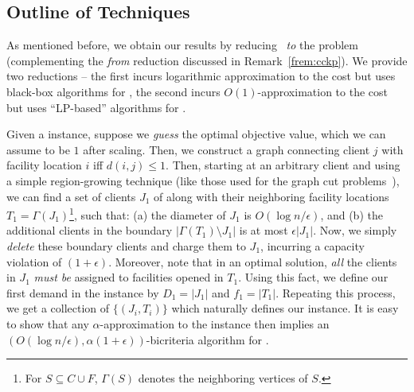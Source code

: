 \subsection{Outline of Techniques} \label{fsec:overview}
As mentioned before, we obtain our results by reducing \mckc~{\em to} the \cckp problem (complementing the {\em from} reduction  discussed in Remark~\ref{frem:cckp}).
We provide two reductions -- the first incurs logarithmic approximation to the cost but uses black-box algorithms for \cckp, the second incurs $O(1)$-approximation to the cost but uses ``LP-based'' algorithms for \cckp.

\medskip {}
Given a \mckc instance, suppose we \emph{guess} the optimal objective value, which we can assume to be $1$ after scaling. Then, we construct a graph connecting client $j$ with facility location $i$ iff $d(i,j) \leq 1$.
Then, starting at an arbitrary client and using a simple region-growing technique (like those used for the graph cut problems~\cite{LeightonR99,GargVY96}), we can find a set of clients $J_1$ of along with their neighboring facility locations $T_1 = \Gamma(J_1)$\footnote{For $S \subseteq C \cup F$, $\Gamma(S)$ denotes the neighboring vertices  of $S$.}, such that: (a) the diameter of $J_1$ is $O(\log n/\epsilon)$, and (b) the additional clients in the boundary $|\Gamma(T_1) \setminus J_1|$ is at most $\epsilon |J_1|$. Now, we simply \emph{delete} these boundary clients and charge them to $J_1$, incurring a capacity violation of $(1+\epsilon)$. Moreover, note that in an optimal solution, \emph{all} the clients in $J_1$ \emph{must be} assigned to facilities opened in $T_1$. Using this fact, we define our first demand in the \cckp instance by $D_1 = |J_1|$ and $f_1 = |T_1|$. Repeating this process, we get a collection of $\{(J_i,T_i)\}$ which naturally defines our \cckp instance. It is easy to show that any $\alpha$-approximation to the \cckp instance then implies an $(O(\log n/\epsilon),  \alpha(1+\epsilon))$-bicriteria algorithm for \mckc.

\iffalse
The weaker decomposition theorem (Theorem~\ref{fthm:weakdecomp}) states that we can delete a subset $\Cd$ of clients and partition the residual instance into portions we call {\em complete neighborhood sets} (Definition~\ref{fdef:comp-nbr}) of $O(\log n/\epsilon)$ diameter.
These sets consists of subsets of facilities $T_i$ and clients $J_i$ such that the optimal solution \emph{must} assign clients in $J_i$ to facilities in $T_i$. This collection of complete-neighborhood sets then naturally leads to a \cckp instance (Remark~\ref{frem:red})
whose solutions translate to \mckc solutions with $O(\log n/\epsilon)$ hit on the cost. Furthermore, the deleted clients $\Cd$ can be charged to clients in $C\setminus \Cd$ such that the capacity of facilities only increase by an $\epsilon$-factor.
We use the {\em region growing technique} which have been used for cut problems~\cite{LeightonR99,GargVY96} to find the set $\Cd$; we keep on growing balls till the total external demand is at most $\epsilon$ times the internal demand.
$O(\log n/\eps)$-radius balls suffice. %
\fi

